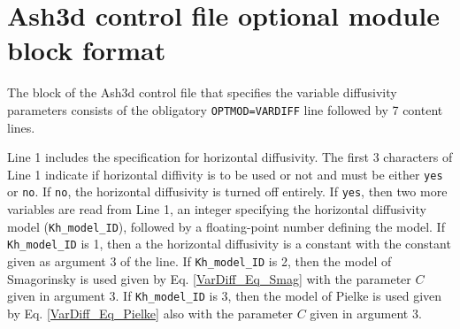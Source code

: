 
\section{Ash3d control file optional module block format}\label{ChapAppendVarDiff_SecContrlBlock}
The block of the Ash3d control file that specifies the variable diffusivity parameters
consists of the obligatory \texttt{OPTMOD=VARDIFF} line followed by 7 content lines.

Line 1 includes the specification for horizontal diffusivity. The first 3 characters of Line 1
indicate if horizontal diffivity is to be used or not and must be either
\texttt{yes} or \texttt{no}. 
If \texttt{no}, the horizontal diffusivity is turned off entirely.
If \texttt{yes}, then two more variables are read from Line 1,
an integer specifying the horizontal diffusivity model (\texttt{Kh\_model\_ID}),
followed by a floating-point number defining the model.
If \texttt{Kh\_model\_ID} is 1, then a the horizontal diffusivity is a constant with the
constant given as argument 3 of the line.
If \texttt{Kh\_model\_ID} is 2, then the model of Smagorinsky is used given by Eq. \ref{VarDiff_Eq_Smag}
with the parameter $C$ given in argument 3.
If \texttt{Kh\_model\_ID} is 3, then the model of Pielke is used given by Eq. \ref{VarDiff_Eq_Pielke}
also with the parameter $C$ given in argument 3.

